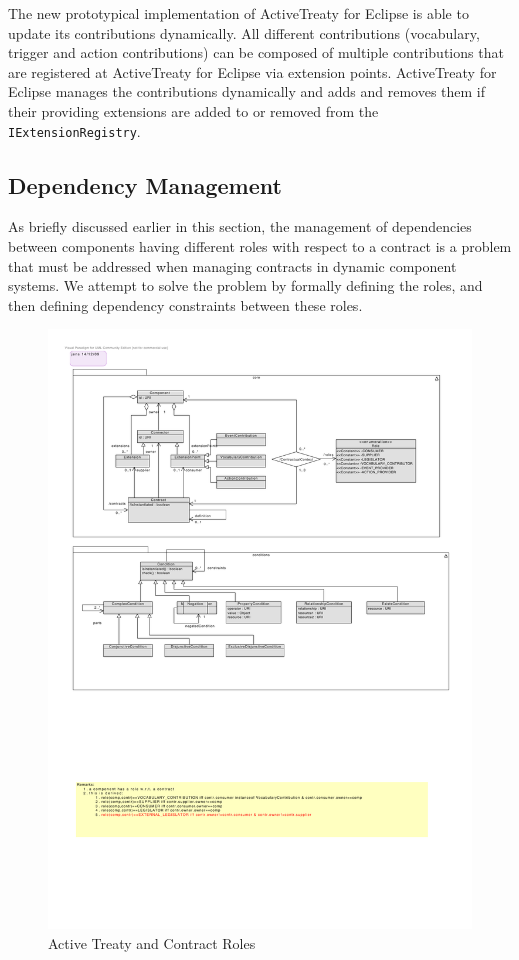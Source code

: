 \documentclass{llncs}
\begin{document}
The new prototypical implementation of ActiveTreaty for Eclipse is able to update its contributions dynamically. All different contributions (vocabulary, trigger and action contributions) can be composed of multiple contributions that are registered at ActiveTreaty for Eclipse via extension points. ActiveTreaty for Eclipse manages the contributions dynamically and adds and removes them if their providing extensions are added to or removed from the \texttt{IExtensionRegistry}.


\subsection{Dependency Management}

As briefly discussed earlier in this section, the management of dependencies between components having different roles with respect to a contract is a problem that must be addressed when managing contracts in dynamic component systems. We attempt to solve the problem by formally defining the roles, and then defining dependency constraints between these roles. 

\begin{figure}[t]
  \centering
  \includegraphics[width=1.0\textwidth]{RoleModel2.pdf}
  \caption{Active Treaty and Contract Roles}
  \label{fig:roles}
\end{figure}
\end{document}
